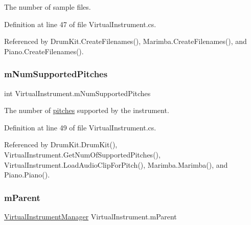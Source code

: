 The number of sample files. 



Definition at line 47 of file Virtual\+Instrument.\+cs.



Referenced by Drum\+Kit.\+Create\+Filenames(), Marimba.\+Create\+Filenames(), and Piano.\+Create\+Filenames().

\mbox{\label{group___v_i_base_pro_var_gafc759a16324cf9b3f230bcbf040afcd2}} 
\subsubsection{\texorpdfstring{m\+Num\+Supported\+Pitches}{mNumSupportedPitches}}
{\footnotesize\ttfamily int Virtual\+Instrument.\+m\+Num\+Supported\+Pitches\hspace{0.3cm}{\ttfamily [protected]}}



The number of \hyperlink{group___music_enums_ga508f69b199ea518f935486c990edac1d}{pitches} supported by the instrument. 



Definition at line 49 of file Virtual\+Instrument.\+cs.



Referenced by Drum\+Kit.\+Drum\+Kit(), Virtual\+Instrument.\+Get\+Num\+Of\+Supported\+Pitches(), Virtual\+Instrument.\+Load\+Audio\+Clip\+For\+Pitch(), Marimba.\+Marimba(), and Piano.\+Piano().

\mbox{\label{group___v_i_base_pro_var_gae4a87a656d9448cfea28215a6b9c3840}} 
\subsubsection{\texorpdfstring{m\+Parent}{mParent}}
{\footnotesize\ttfamily \hyperlink{class_virtual_instrument_manager}{Virtual\+Instrument\+Manager} Virtual\+Instrument.\+m\+Parent\hspace{0.3cm}{\ttfamily [protected]}}



